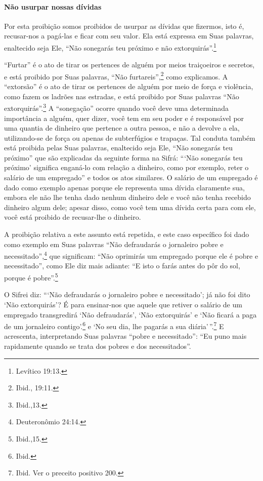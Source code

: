 \paragraph{Não usurpar nossas dívidas}

Por esta proibição somos proibidos de usurpar as dívidas que fizermos,
isto é, recusar-nos a pagá-las e ficar com seu valor. Ela está expressa
em Suas palavras, enaltecido seja Ele, ``Não sonegarás teu próximo e não
extorquirás''.\footnote{Levítico 19:13.}

``Furtar'' é o ato de tirar os pertences de alguém por meios
traiçoeiros e secretos, e está proibido por Suas palavras, ``Não
furtareis'',\footnote{Ibid., 19:11.} como explicamos. A ``extorsão'' é o ato de
tirar os pertences de alguém por meio de força e violência, como fazem
os ladrões nas estradas, e está proibido por Suas palavras ``Não
extorquirás''.\footnote{Ibid.,13.} A ``sonegação'' ocorre quando você deve uma
determinada importância a alguém, quer dizer, você tem em seu poder e é
responsável por uma quantia de dinheiro que pertence a outra pessoa, e
não a devolve a ela, utilizando-se de força ou apenas de subterfúgios e
trapaças. Tal conduta também está proibida pelas Suas palavras,
enaltecido seja Ele, ``Não sonegarás teu próximo'' que são explicadas da
seguinte forma na Sifrá: ```Não sonegarás teu próximo' significa
enganá-lo com relação a dinheiro, como por exemplo, reter o salário de
um empregado'' e todos os atos similares. O salário de um empregado é
dado como exemplo apenas porque ele representa uma dívida claramente
sua, embora ele não lhe tenha dado nenhum dinheiro dele e você não
tenha recebido dinheiro algum dele; apesar disso, como você tem uma
dívida certa para com ele, você está proibido de recusar-lhe o dinheiro.

A proibição relativa a este assunto está repetida, e este caso
específico foi dado como exemplo em Suas palavras ``Não defraudarás o
jornaleiro pobre e necessitado'',\footnote{Deuteronômio 24:14.} que significam:
``Não oprimirás um empregado porque ele é pobre e necessitado'', como
Ele diz mais adiante: ``E isto o farás antes do pôr do sol, porque é
pobre''.\footnote{Ibid.,15.}

O Sifrei diz: ```Não defraudarás o jornaleiro pobre e necessitado'; já
não foi dito `Não extorquirás'? É para ensinar-nos que aquele que
retiver o salário de um empregado transgredirá `Não defraudarás', `Não
extorquirás' e `Não ficará a paga de um jornaleiro contigo'.\footnote{Ibid.} e
`No seu dia, lhe pagarás a sua diária'\,''.\footnote{Ibid. Ver o preceito positivo 200.} E acrescenta, interpretando Suas
palavras ``pobre e necessitado'': ``Eu puno mais rapidamente quando se
trata dos pobres e dos necessitados''.

